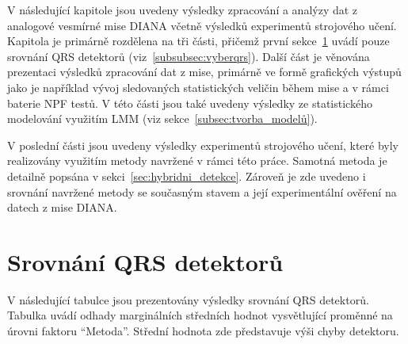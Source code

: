 V následující kapitole jsou uvedeny výsledky zpracování a analýzy dat z
analogové vesmírné mise DIANA včetně výsledků experimentů strojového učení.
Kapitola je primárně rozdělena na tři části, přičemž první
sekce~\ref{sec:vysledky_qrs} uvádí pouze srovnání QRS detektorů
(viz~\ref{subsubsec:vyberqrs}). Další část je věnována prezentaci výsledků
zpracování dat z mise, primárně ve formě grafických výstupů jako je například
vývoj sledovaných statistických veličin během mise a v rámci baterie \gls{NPF}
testů. V této části jsou také uvedeny výsledky ze statistického modelování
využitím \gls{LMM} (viz sekce~\ref{subsec:tvorba_modelů}).

V poslední části jsou uvedeny výsledky experimentů strojového učení, které byly
realizovány využitím metody navržené v rámci této práce. Samotná metoda je
detailně popsána v sekci~\ref{sec:hybridni_detekce}. Zároveň je zde uvedeno i
srovnání navržené metody se současným stavem a její experimentální ověření na
datech z mise DIANA.

\section{Srovnání QRS detektorů}
\label{sec:vysledky_qrs}
V následující tabulce jsou prezentovány výsledky srovnání QRS detektorů. Tabulka
uvádí odhady marginálních středních hodnot vysvětlující proměnné na úrovni
faktoru \enquote{Metoda}. Střední hodnota zde představuje výši chyby detektoru.

